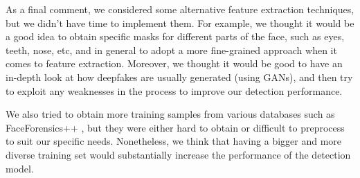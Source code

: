 \documentclass[11pt]{article}
\begin{document}
As a final comment, we considered some alternative feature extraction techniques, but we didn't have time to implement them. For example, we thought it would be a good idea to obtain specific masks for different parts of the face, such as eyes, teeth, nose, etc, and in general to adopt a more fine-grained approach when it comes to feature extraction. Moreover, we thought it would be good to have an in-depth look at how deepfakes are usually generated (using GANs), and then try to exploit any weaknesses in the process to improve our detection performance.

We also tried to obtain more training samples from various databases such as FaceForensics++ \citep{rossler2018faceforensics}, but they were either hard to obtain or difficult to preprocess to suit our specific needs. Nonetheless, we think that having a bigger and more diverse training set would substantially increase the performance of the detection model.




\end{document}
